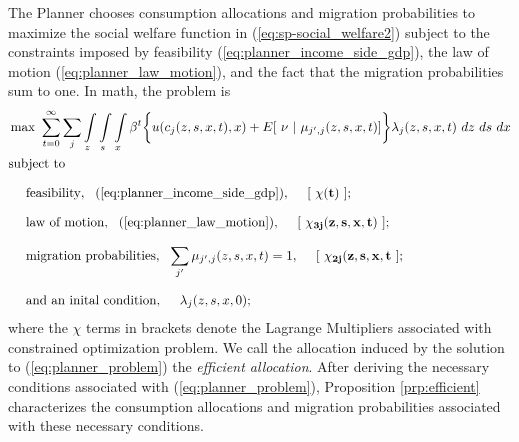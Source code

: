 \documentclass[12pt,pdftex]{article}
\begin{document}
The Planner chooses consumption allocations and migration probabilities to maximize the social welfare function in (\ref{eq:sp-social_welfare2}) subject to the constraints imposed by feasibility (\ref{eq:planner_income_side_gdp}), the law of motion (\ref{eq:planner_law_motion}), and the fact that the migration probabilities sum to one. In math, the problem is
\begin{align}
\small
& \max \ \sum_{t=0}^{\infty}\sum_{j} \int\limits_{z} \int\limits_{s} \int\limits_{x} \beta^{t} \bigg \{ u(c_{j}(z, s, x, t), x) + E[\ \nu \ | \ \mu_{j',j}(z, s,x,t)] \bigg \} \lambda_{j}(z, s, x, t) \ dz \ ds \ dx \label{eq:planner_problem} \\
& \mbox{subject to} \nonumber\\[.75em]
& \ \ \ \ \mbox{feasibility}, \ \ (\ref{eq:planner_income_side_gdp}), \ \ \ \ [\ \mathbf{\chi(t)} \ ]; \nonumber \\[.75em]
& \ \ \ \ \mbox{law of motion}, \ \ (\ref{eq:planner_law_motion}), \ \ \ \ [\ \mathbf{\chi_{3j}(z, s, x, t)} \ ]; \nonumber \\[.75em]
& \ \ \ \ \mbox{migration probabilities}, \ \ \sum_{j'} \mu_{j',j}(z,s,x,t) = 1,  \ \ \ \ [\ \mathbf{\chi_{2j}(z, s, x, t} \ ]; \nonumber \\[.75em]
& \ \ \ \ \mbox{and an inital condition}, \ \ \ \ \lambda_j(z, s, x,0); \nonumber
\end{align}
where the $\chi$ terms in brackets denote the Lagrange Multipliers associated with constrained optimization problem. We call the allocation induced by the solution to (\ref{eq:planner_problem}) the \emph{efficient allocation}. After deriving the necessary conditions associated with (\ref{eq:planner_problem}), Proposition \ref{prp:efficient} characterizes the consumption allocations and migration probabilities associated with these necessary conditions.
\end{document}
